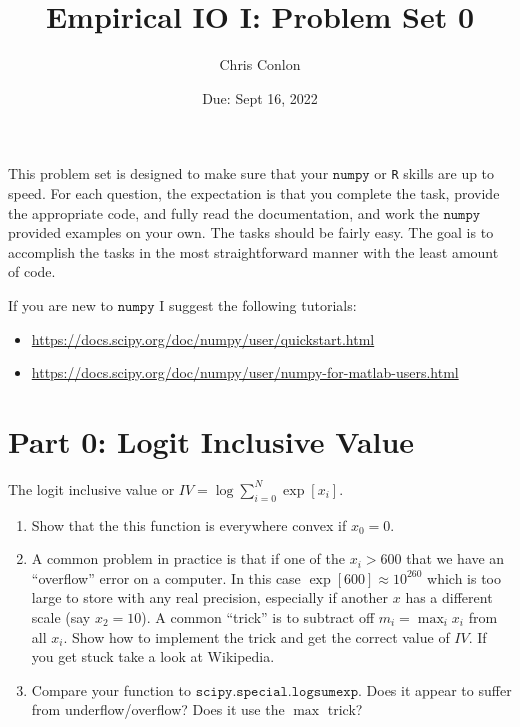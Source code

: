 \documentclass{article}
\begin{document}
\title{Empirical IO I: Problem Set 0} 
\author{Chris Conlon}
\date{Due: Sept 16, 2022}
\maketitle
This problem set is designed to make sure that your $\mathtt{numpy}$ or \texttt{R} skills are up to speed. For each question, the expectation is that you complete the task, provide the appropriate code, and fully read the documentation, and work the $\mathtt{numpy}$ provided examples on your own.  The tasks should be fairly easy.  The goal is to accomplish the tasks in the most straightforward manner with the least amount of code.  

If you are new to $\mathtt{numpy}$ I suggest the following tutorials:
\begin{itemize}
\item \url{https://docs.scipy.org/doc/numpy/user/quickstart.html}
\item  \url{https://docs.scipy.org/doc/numpy/user/numpy-for-matlab-users.html}
\end{itemize}

\section*{Part 0: Logit Inclusive Value}
The logit inclusive value or $IV = \log \sum_{i=0}^N \exp[x_i]$.
\begin{enumerate}
\item Show that the this function is everywhere convex if $x_0=0$.
\item A common problem in practice is that if one of the $x_i > 600$ that we have an ``overflow'' error on a computer. In this case $\exp[600] \approx 10^{260}$ which is too large to store with any real precision, especially if another $x$ has a different scale (say $x_2=10$). A common ``trick'' is to subtract off $m_i = \max_i x_i$ from all $x_i$.  Show how to implement the trick and get the correct value of $IV$. If you get stuck take a look at Wikipedia.
\item Compare your function to $\mathtt{scipy.special.logsumexp}$. Does it appear to suffer from underflow/overflow? Does it use the $\max$ trick?
\end{enumerate}
\end{document}
